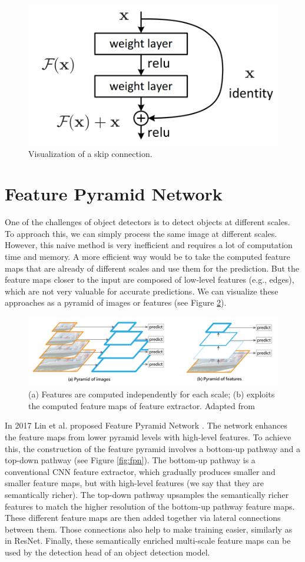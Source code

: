 \begin{figure}[h]
    \centering
    \includegraphics[width=0.4\linewidth]{Sources/Figures/residual_block.png}
    \caption{Visualization of a skip connection.}
    \label{fig:residual_block}
\end{figure}

\section{Feature Pyramid Network}
One of the challenges of object detectors is to detect objects at different scales. To approach this, we can simply process the same image at different scales. However, this naive method is very inefficient and requires a lot of computation time and memory. A more efficient way would be to take the computed feature maps that are already of different scales and use them for the prediction. But the feature maps closer to the input are composed of low-level features (e.g., edges), which are not very valuable for accurate predictions. We can visualize these approaches as a pyramid of images or features (see Figure \ref{fig:pyramids}). 

\begin{figure}[h]
    \centering
    \includegraphics[width=\linewidth]{Sources/Figures/pyramids.png}
    \caption{(a) Features are computed independently for each scale; (b) exploits the computed feature maps of feature extractor. Adapted from \cite{fpn}}
    \label{fig:pyramids}
\end{figure}

In 2017 Lin et al. proposed Feature Pyramid Network \cite{fpn}. The network enhances the feature maps from lower pyramid levels with high-level features. To achieve this, the construction of the feature pyramid involves a bottom-up pathway and a top-down pathway (see Figure \ref{fig:fpn}). The bottom-up pathway is a conventional CNN feature extractor, which gradually produces smaller and smaller feature maps, but with high-level features (we say that they are semantically richer). The top-down pathway upsamples the semantically richer features to match the higher resolution of the bottom-up pathway feature maps. These different feature maps are then added together via lateral connections between them. Those connections also help to make training easier, similarly as in ResNet.  Finally, these semantically enriched multi-scale feature maps can be used by the detection head of an object detection model. 


